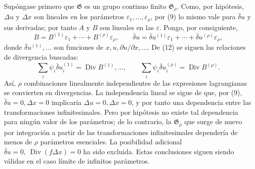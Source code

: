 \documentclass[11pt]{article}
\newcommand{\D}{\Delta}
\newcommand{\eps}{\varepsilon}
\providecommand{\Div}{\operatorname{Div}}
\providecommand{\G}{\mathfrak G}
\providecommand{\bd}{\bar{\delta}}
\providecommand{\p}{\partial}
\begin{document}
Supóngase primero que \(\G\) es un grupo continuo finito \(\G_\rho\). Como, por hipótesis, \(\D u\) y \(\D x\) son lineales en los parámetros \(\eps_1,\ldots,\eps_\rho\), por (9) lo mismo vale para \(\bd u\) y sus derivadas; por tanto \(A\) y \(B\) son lineales en las \(\eps\). Pongo, por consiguiente,
\[
B=B^{(1)}\eps_1+\cdots+B^{(\rho)}\eps_\rho,\qquad
\bd u=\bd u^{(1)}\eps_1+\cdots+\bd u^{(\rho)}\eps_\rho,
\]
donde \(\bd u^{(1)},\ldots\) son funciones de \(x,u,\p u/\p x,\ldots\). De (12) se siguen las relaciones de divergencia buscadas:
\begin{equation}
\sum_i\psi_i\bd u_i^{(1)}=\Div B^{(1)},\ldots,\qquad
\sum_i\psi_i\bd u_i^{(\rho)}=\Div B^{(\rho)}.
\tag{13}
\end{equation}
Así, \(\rho\) combinaciones linealmente independientes de las expresiones lagrangianas se convierten en divergencias. La independencia lineal se sigue de que, por (9), \(\bd u=0,\D x=0\) implicaría \(\D u=0,\D x=0\), y por tanto una dependencia entre las transformaciones infinitesimales. Pero por hipótesis no existe tal dependencia para ningún valor de los parámetros; de lo contrario, la \(\G_\rho\) que surge de nuevo por integración a partir de las transformaciones infinitesimales dependería de menos de \(\rho\) parámetros esenciales. La posibilidad adicional \(\bd u=0,\ \Div(f\D x)=0\) ha sido excluida. Estas conclusiones siguen siendo válidas en el caso límite de infinitos parámetros.
\end{document}
